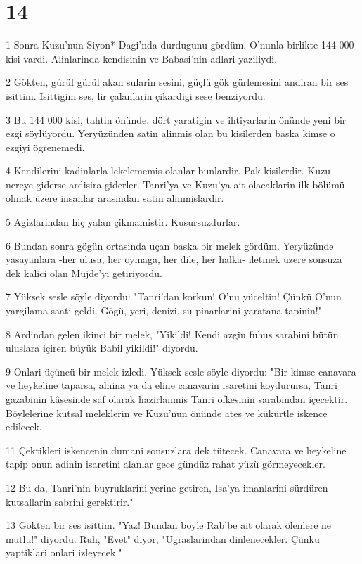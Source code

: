 \chapter{14}

\par 1 Sonra Kuzu'nun Siyon* Dagi'nda durdugunu gördüm. O'nunla birlikte 144 000 kisi vardi. Alinlarinda kendisinin ve Babasi'nin adlari yaziliydi.
\par 2 Gökten, gürül gürül akan sularin sesini, güçlü gök gürlemesini andiran bir ses isittim. Isittigim ses, lir çalanlarin çikardigi sese benziyordu.
\par 3 Bu 144 000 kisi, tahtin önünde, dört yaratigin ve ihtiyarlarin önünde yeni bir ezgi söylüyordu. Yeryüzünden satin alinmis olan bu kisilerden baska kimse o ezgiyi ögrenemedi.
\par 4 Kendilerini kadinlarla lekelememis olanlar bunlardir. Pak kisilerdir. Kuzu nereye giderse ardisira giderler. Tanri'ya ve Kuzu'ya ait olacaklarin ilk bölümü olmak üzere insanlar arasindan satin alinmislardir.
\par 5 Agizlarindan hiç yalan çikmamistir. Kusursuzdurlar.
\par 6 Bundan sonra gögün ortasinda uçan baska bir melek gördüm. Yeryüzünde yasayanlara -her ulusa, her oymaga, her dile, her halka- iletmek üzere sonsuza dek kalici olan Müjde'yi getiriyordu.
\par 7 Yüksek sesle söyle diyordu: "Tanri'dan korkun! O'nu yüceltin! Çünkü O'nun yargilama saati geldi. Gögü, yeri, denizi, su pinarlarini yaratana tapinin!"
\par 8 Ardindan gelen ikinci bir melek, "Yikildi! Kendi azgin fuhus sarabini bütün uluslara içiren büyük Babil yikildi!" diyordu.
\par 9 Onlari üçüncü bir melek izledi. Yüksek sesle söyle diyordu: "Bir kimse canavara ve heykeline taparsa, alnina ya da eline canavarin isaretini koydurursa, Tanri gazabinin kâsesinde saf olarak hazirlanmis Tanri öfkesinin sarabindan içecektir. Böylelerine kutsal meleklerin ve Kuzu'nun önünde ates ve kükürtle iskence edilecek.
\par 11 Çektikleri iskencenin dumani sonsuzlara dek tütecek. Canavara ve heykeline tapip onun adinin isaretini alanlar gece gündüz rahat yüzü görmeyecekler.
\par 12 Bu da, Tanri'nin buyruklarini yerine getiren, Isa'ya imanlarini sürdüren kutsallarin sabrini gerektirir."
\par 13 Gökten bir ses isittim. "Yaz! Bundan böyle Rab'be ait olarak ölenlere ne mutlu!" diyordu. Ruh, "Evet" diyor, "Ugraslarindan dinlenecekler. Çünkü yaptiklari onlari izleyecek."
